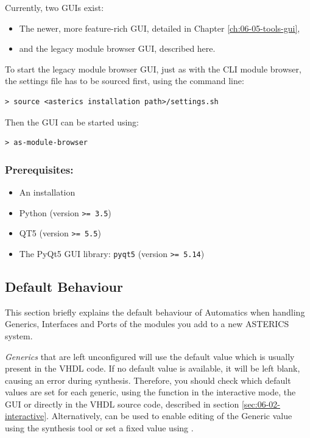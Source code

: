 Currently, two GUIs exist:

\begin{itemize}
\item The newer, more feature-rich \asterics GUI, detailed in Chapter \ref{ch:06-05-tools-gui},
\item and the legacy module browser GUI, described here.
\end{itemize}


To start the legacy module browser GUI, just as with the CLI module browser, the \asterics settings file has to be sourced first, using the command line:
\begin{lstlisting}[style=shell]
 > source <asterics installation path>/settings.sh
\end{lstlisting}

Then the GUI can be started using:
\begin{lstlisting}[style=shell]
 > as-module-browser
\end{lstlisting}

\subsubsection*{Prerequisites:}

\begin{itemize}
\item An \asterics installation
\item Python (version \texttt{>= 3.5}) 
\item QT5 (version \texttt{>= 5.5})
\item The PyQt5 GUI library: \texttt{pyqt5} (version \texttt{>= 5.14})
\end{itemize}


\subsection{Default Behaviour}
\label{sec:06-02-default}

This section briefly explains the default behaviour of Automatics when handling Generics, Interfaces and Ports of the modules you add to a new ASTERICS system.

\textit{Generics} that are left unconfigured will use the default value which is usually present in the VHDL code.
If no default value is available, it will be left blank, causing an error during synthesis.
Therefore, you should check which default values are set for each generic, using the  function in the interactive mode, the GUI or directly in the VHDL source code, described in section \ref{sec:06-02-interactive}.
Alternatively,  can be used to enable editing of the Generic value using the synthesis tool or set a fixed value using .

